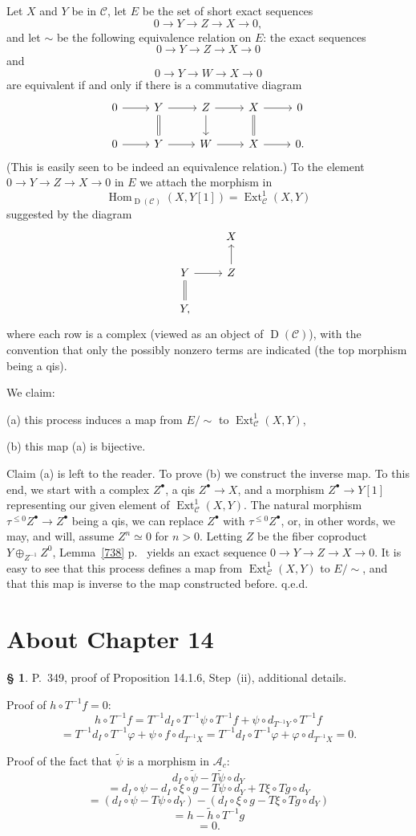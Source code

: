 \documentclass[12pt]{article}%
\theoremstyle{remark}
\theoremstyle{definition}
\newtheorem{s}[thm]{\S}%
\newcommand{\nn}{\noindent}
\newcommand{\oo}{\operatorname}
\newcommand{\A}{\mathcal A}
\newcommand{\C}{\mathcal C}
\newcommand{\pp}{\varphi}
\DeclareMathOperator{\Ext}{Ext}
\DeclareMathOperator{\Hom}{Hom}%
\begin{document}
Let $X$ and $Y$ be in $\C$, let $E$ be the set of short exact sequences 
$$
0\to Y\to Z\to X\to0,
$$ 
and let $\sim$ be the following equivalence relation on $E$: the exact sequences 
$$
0\to Y\to Z\to X\to0
$$ 
and 
$$
0\to Y\to W\to X\to0
$$ 
are equivalent if and only if there is a commutative diagram 
$$
\begin{tikzcd}
0\ar{r}&Y\ar[equal]{d}\ar{r}&Z\ar{d}\ar{r}&X\ar[equal]{d}\ar{r}&0\\ 
0\ar{r}&Y\ar{r}&W\ar{r}&X\ar{r}&0.
\end{tikzcd}
$$ 
(This is easily seen to be indeed an equivalence relation.) To the element $0\to Y\to Z\to X\to0$ in $E$ we attach the morphism in 
$$
\Hom_{\oo D(\C)}(X,Y[1])=\Ext^1_\C(X,Y)
$$ 
suggested by the diagram 
$$
\begin{tikzcd}
{}&X\\ 
Y\ar[equal]{d}\ar{r}&Z\ar{u}\\ 
Y,
\end{tikzcd}
$$ 
where each row is a complex (viewed as an object of $\oo D(\C)$), with the convention that only the possibly nonzero terms are indicated (the top morphism being a qis). 

We claim: 

(a) this process induces a map from $E/\!\!\sim$ to $\Ext^1_\C(X,Y)$, 

(b) this map (a) is bijective. 

Claim (a) is left to the reader. To prove (b) we construct the inverse map. To this end, we start with a complex $Z^\bullet$, a qis $Z^\bullet\to X$, and a morphism $Z^\bullet\to Y[1]$ representing our given element of $\Ext^1_\C(X,Y)$. The natural morphism $\tau^{\le0}Z^\bullet\to Z^\bullet$ being a qis, we can replace $Z^\bullet$ with $\tau^{\le0}Z^\bullet$, or, in other words, we may, and will, assume $Z^n\simeq0$ for $n>0$. Letting $Z$ be the fiber coproduct $Y\oplus_{Z^{-1}}Z^0$, Lemma~\ref{738} p.~\pageref{738} yields an exact sequence $0\to Y\to Z\to X\to0$. It is easy to see that this process defines a map from $\Ext^1_\C(X,Y)$ to $E/\!\!\sim$, and that this map is inverse to the map constructed before. q.e.d.


\section{About Chapter 14}

\begin{s} 
P.~349, proof of Proposition 14.1.6, Step~(ii), additional details. 

\nn Proof of $h\circ T^{-1}f=0$: 
$$
h\circ T^{-1}f=T^{-1}d_I\circ T^{-1}\psi\circ T^{-1}f+\psi\circ d_{T^{-1}Y}\circ T^{-1}f
$$ 
$$
=T^{-1}d_I\circ T^{-1}\pp+\psi\circ f\circ d_{T^{-1}X}=T^{-1}d_I\circ T^{-1}\pp+\pp\circ d_{T^{-1}X}=0.
$$ 

\nn Proof of the fact that $\widetilde\psi$ is a morphism in $\A_c$: 
$$
d_I\circ\widetilde\psi-T\widetilde\psi\circ d_Y
$$
$$
=d_I\circ\psi-d_I\circ\xi\circ g-T\psi\circ d_Y+T\xi\circ Tg\circ d_Y
$$
$$
=(d_I\circ\psi-T\psi\circ d_Y)-(d_I\circ\xi\circ g-T\xi\circ Tg\circ d_Y)
$$
$$
=h-\widetilde h\circ T^{-1}g
$$
$$
=0.
$$
\end{s}
\end{document}
